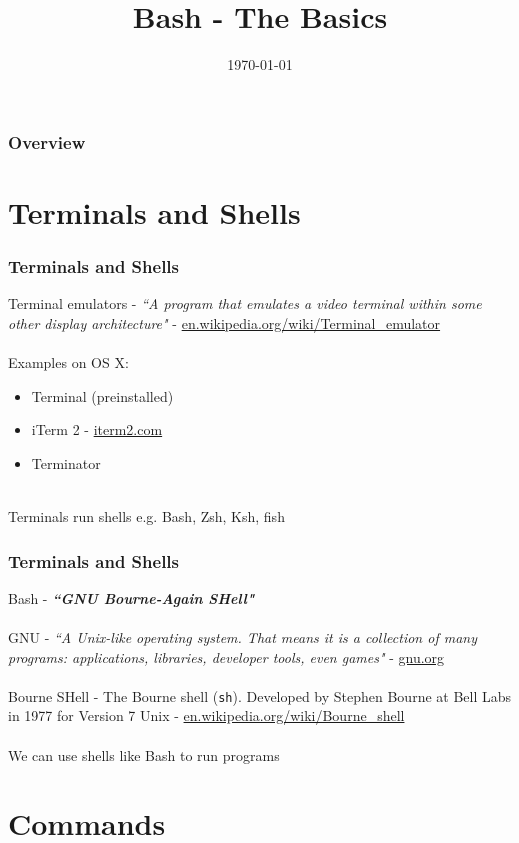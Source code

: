 \documentclass{beamer}
\title[Bash]{Bash - The Basics} %
\author{} %
\institute[] %
{
 \\ %
\medskip
\textit{chris@cjwfuller.com}
}
\date{\today}
\begin{document}
\begin{frame}
\titlepage
\end{frame}

\begin{frame}
\frametitle{Overview}
\tableofcontents
\end{frame}

\section{Terminals and Shells}

\begin{frame}
\frametitle{Terminals and Shells}
Terminal emulators  - \textit{``A program that emulates a video terminal within some other display architecture"} - \url{en.wikipedia.org/wiki/Terminal_emulator}
\\~\\
Examples on OS X:
\begin{itemize}
	\item Terminal (preinstalled)
	\item iTerm 2 - \url{iterm2.com}
	\item Terminator
\end{itemize}
~\\
Terminals run shells e.g. Bash, Zsh, Ksh, fish
\end{frame}


\begin{frame}
\frametitle{Terminals and Shells}
Bash - \textbf{\textit{``GNU Bourne-Again SHell"}}
\\~\\
GNU - \textit{``A Unix-like operating system. That means it is a collection of many programs: applications, libraries, developer tools, even games"} - \url{gnu.org}
\\~\\
Bourne SHell - The Bourne shell (\texttt{sh}).  Developed by Stephen Bourne at Bell Labs in 1977 for Version 7 Unix - \url{en.wikipedia.org/wiki/Bourne_shell}
\\~\\
We can use shells like Bash to run programs
\end{frame}

\section{Commands}
\end{document}
